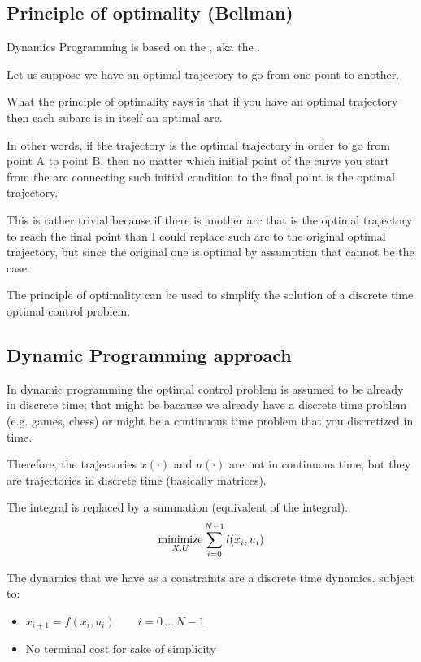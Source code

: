 \subsection{Principle of optimality (Bellman)}
Dynamics Programming is based on the , aka the .

Let us suppose we have an optimal trajectory to go from one point to another. 

What the principle of optimality says is that if you have an optimal trajectory then each subarc is in itself an optimal arc.

In other words, if the trajectory is the optimal trajectory in order to go from point A to point B, then no matter which initial point of the curve you start from the arc connecting such initial condition to the final point is the optimal trajectory.

This is rather trivial because if there is another arc that is the optimal trajectory to reach the final point than I could replace such arc to the original optimal trajectory, but since the original one is optimal by assumption that cannot be the case.

The principle of optimality can be used to simplify the solution of a discrete time optimal control problem.
\subsection{Dynamic Programming approach}

In dynamic programming the optimal control problem is assumed to be already in discrete time; that might be bacause we already have a discrete time problem (e.g. games, chess) or might be a continuous time problem that you discretized in time.

Therefore, the trajectories $x(\cdot)$ and $u(\cdot)$ are not in continuous time, but they are trajectories in discrete time (basically matrices).

The integral is replaced by a summation (equivalent of the integral).
\[\operatorname*{minimize}_{X, U} \sum_{i=0}^{N-1} l(x_i, u_i)\]

The dynamics	that we have as a constraints are a discrete time dynamics.
subject to:
\begin{itemize}
\item $x_{i+1} = f(x_i, u_i)\qquad i = 0\,...\,N-1$
\item No terminal cost for sake of simplicity
\end{itemize}

